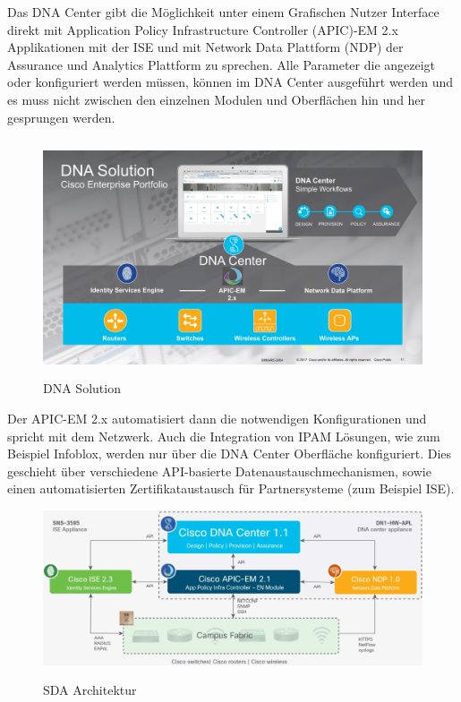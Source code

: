 Das DNA Center gibt die Möglichkeit unter einem Grafischen Nutzer Interface direkt mit Application Policy Infrastructure Controller (APIC)-EM 2.x Applikationen mit der ISE und mit Network Data Plattform (NDP) der Assurance und Analytics Plattform zu sprechen. Alle Parameter die angezeigt oder konfiguriert werden müssen, können im DNA Center ausgeführt werden und es muss nicht zwischen den einzelnen Modulen und Oberflächen hin und her gesprungen werden.
\begin{figure}[H]
	\centering
	\includegraphics[height=7cm]{img/DNAC-1.jpg}
	\caption{DNA Solution \cite{cisco-blog-wasistdnacenter}}
	\label{fig:Aufbau einer DNA Solution}
\end{figure}
Der APIC-EM 2.x automatisiert dann die notwendigen Konfigurationen und spricht mit dem Netzwerk. Auch die Integration von IPAM Lösungen, wie zum Beispiel Infoblox, werden nur über die DNA Center Oberfläche konfiguriert. Dies geschieht über verschiedene API-basierte Datenaustauschmechanismen, sowie einen automatisierten Zertifikataustausch für Partnersysteme (zum Beispiel ISE). \cite{sda-whitepaper} \\

\begin{figure}[H]
	\centering
	\includegraphics[width=1\linewidth]{img/ControllerLayer.png}\\[1px]
	\caption{SDA Architektur \cite{sda-whitepaper} }
	\label{fig:SDA Architektur}
\end{figure}

